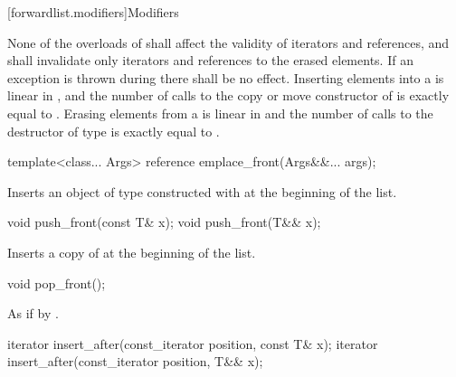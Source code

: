 \begin{itemdescr}
\pnum
\returns {}
\end{itemdescr}

[forwardlist.modifiers]{Modifiers}

\pnum
None of the overloads of  shall affect the validity of iterators and
references, and  shall invalidate only iterators and references to
the erased elements. If an exception is thrown during  there shall
be no effect. Inserting  elements into a  is linear in
, and the number of calls to the copy or move constructor of  is
exactly equal to . Erasing  elements from a  is
linear in  and the number of calls to the destructor of type  is
exactly equal to .

%
\begin{itemdecl}
template<class... Args> reference emplace_front(Args&&... args);
\end{itemdecl}

\begin{itemdescr}
\pnum
\effects Inserts an object of type  constructed with
 at the beginning of the list.
\end{itemdescr}

%
\begin{itemdecl}
void push_front(const T& x);
void push_front(T&& x);
\end{itemdecl}

\begin{itemdescr}
\pnum
\effects Inserts a copy of  at the beginning of the list.
\end{itemdescr}


%
\begin{itemdecl}
void pop_front();
\end{itemdecl}

\begin{itemdescr}
\pnum
\effects As if by .
\end{itemdescr}

%
\begin{itemdecl}
iterator insert_after(const_iterator position, const T& x);
iterator insert_after(const_iterator position, T&& x);
\end{itemdecl}

